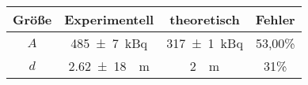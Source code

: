 \label{tab:tabFehler}
	\begin{tabular}{cS[table-format=2.0]S[table-format=3.2]S[table-format=3.2]}
		\toprule
		{Größe}&{Experimentell}&{theoretisch}&{Fehler}\\
		\midrule
		$A$ & \SI{485(7)}{\kilo\becquerel} & \SI{317(1)}{\kilo\becquerel}  & 53,00\% \\
		$d$ & \SI{2,62(18)}{\mikro\meter} & \SI{2}{\mikro\meter} & 31\%\\
		\bottomrule
	\end{tabular}
